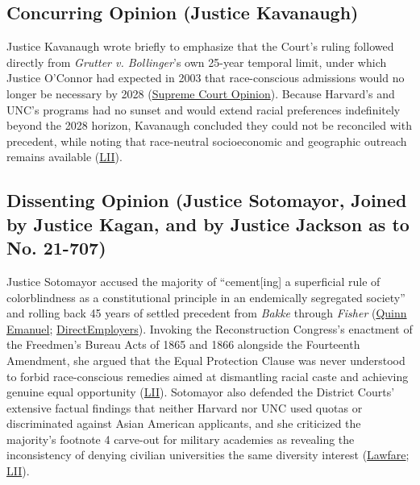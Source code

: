 \documentclass[12pt]{article}
\begin{document}
\subsection{Concurring Opinion (Justice Kavanaugh)}

Justice Kavanaugh wrote briefly to emphasize that the Court's ruling followed directly from \textit{Grutter v. Bollinger}'s own 25-year temporal limit, under which Justice O'Connor had expected in 2003 that race-conscious admissions would no longer be necessary by 2028 (\href{https://www.supremecourt.gov/opinions/22pdf/20-1199_hgdj.pdf}{Supreme Court Opinion}). Because Harvard's and UNC's programs had no sunset and would extend racial preferences indefinitely beyond the 2028 horizon, Kavanaugh concluded they could not be reconciled with precedent, while noting that race-neutral socioeconomic and geographic outreach remains available (\href{https://www.law.cornell.edu/supremecourt/text/20-1199}{LII}).

\subsection{Dissenting Opinion (Justice Sotomayor, Joined by Justice Kagan, and by Justice Jackson as to No. 21-707)}

Justice Sotomayor accused the majority of ``cement[ing] a superficial rule of colorblindness as a constitutional principle in an endemically segregated society'' and rolling back 45 years of settled precedent from \textit{Bakke} through \textit{Fisher} (\href{https://www.quinnemanuel.com/the-firm/publications/the-road-ahead-fostering-diversity-after-the-supreme-court-s-decision-overturning-affirmative-action-in-university-admissions/}{Quinn Emanuel}; \href{https://directemployers.org/2023/07/03/scotus-ends-its-45-year-detour-around-the-equal-protection-clause-by-now-finding-race-based-admissions-practices-at-harvard-and-unc-unlawful/}{DirectEmployers}). Invoking the Reconstruction Congress's enactment of the Freedmen's Bureau Acts of 1865 and 1866 alongside the Fourteenth Amendment, she argued that the Equal Protection Clause was never understood to forbid race-conscious remedies aimed at dismantling racial caste and achieving genuine equal opportunity (\href{https://www.law.cornell.edu/supremecourt/text/20-1199}{LII}). Sotomayor also defended the District Courts' extensive factual findings that neither Harvard nor UNC used quotas or discriminated against Asian American applicants, and she criticized the majority's footnote 4 carve-out for military academies as revealing the inconsistency of denying civilian universities the same diversity interest (\href{https://www.lawfaremedia.org/article/the-national-security-footnote-in-the-affirmative-action-decision}{Lawfare}; \href{https://www.law.cornell.edu/supremecourt/text/20-1199}{LII}).
\end{document}
